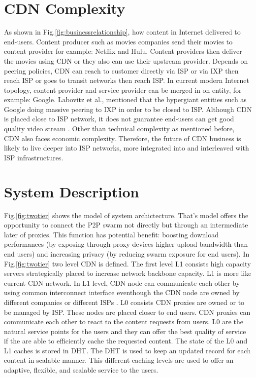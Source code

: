 \documentclass[paper]{ieice}
\begin{document}
\section{CDN Complexity}
As shown in Fig.\ref{fig:businessrelationship}, how content in Internet delivered to end-users.  
Content producer such as movies companies send their movies to content provider for example: Netflix and Hulu.
Content providers then deliver the movies using CDN or they also can use their upstream provider.
Depends on peering policies, CDN can reach to customer directly via ISP or via IXP then reach ISP or goes to transit networks then reach ISP.   
In current modern Internet topology, content provider and service provider can be merged in on entity, for example: Google.
Labovitz et al.,\cite{Labovitz:2010:IIT:2043164.1851194} mentioned that the hypergiant entities such as Google doing massive peering to IXP in order to be closed to ISP. 
Although CDN is placed close to ISP network, it does not guarantee end-users can get good quality video stream \cite{Krishnan:2009:MBE:1644893.1644917}.
Other than technical complexity as mentioned before, CDN also faces economic complexity.
Therefore, the future of CDN business is likely to live deeper into ISP networks, more integrated into and interleaved with ISP infrastructures.


\section{System Description}\label{description}

Fig.\ref{fig:twotier} shows the model of system archictecture.
That's model offers the opportunity to connect the P2P swarm not directly but through an intermediate later of proxies.
This function has potential benefit: boosting download performances (by exposing through proxy devices higher upload bandwidth than end users) and increasing privacy (by reducing swarm exposure for end users).
In Fig.\ref{fig:twotier} two level CDN is defined.
The first level L1 consists high capacity servers strategically placed to increase network backbone capacity.
L1 is more like current CDN network.
In L1 level, CDN node can communicate each other by using common interconnect interface eventhough the CDN node are owned by different companies or different ISPs \cite{cdni}.
L0 consists CDN proxies are owned or to be managed by ISP.
These nodes are placed closer to end users. 
CDN proxies can communicate each other to react to the content requests from users.
L0 are the natural service points for the users and they can offer the best quality of service if the are able to efficiently cache the requested content.
The state of the L0 and L1 caches is stored in DHT. 
The DHT is used to keep an updated record for each content in scalable manner. 
This different caching levels are used to offer an adaptive, flexible, and scalable service to the users.
\end{document}
